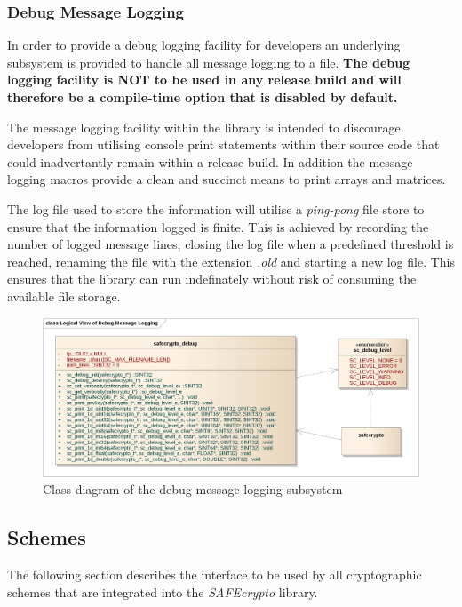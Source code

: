 \subsubsection{Debug Message Logging}

In order to provide a debug logging facility for developers an underlying subsystem is provided to handle all message logging to a file. \textbf{The debug logging facility is NOT to be used in any release build and will therefore be a compile-time option that is disabled by default.}

The message logging facility within the library is intended to discourage developers from utilising console print statements within their source code that could inadvertantly remain within a release build. In addition the message logging macros provide a clean and succinct means to print arrays and matrices.

The log file used to store the information will utilise a \textit{ping-pong} file store to ensure that the information logged is finite. This is achieved by recording the number of logged message lines, closing the log file when a predefined threshold is reached, renaming the file with the extension \textit{.old} and starting a new log file. This ensures that the library can run indefinately without risk of consuming the available file storage.

\begin{figure}[!h]
\centering{}
\includegraphics[width=\textwidth]{libsafecrypto_debug_logical_view.png}
\caption{Class diagram of the debug message logging subsystem}
\label{fig:safecrypto_debug_logging}
\end{figure}



\newpage
\subsection{Schemes}

The following section describes the interface to be used by all cryptographic schemes that are integrated into the \textit{SAFEcrypto} library.

